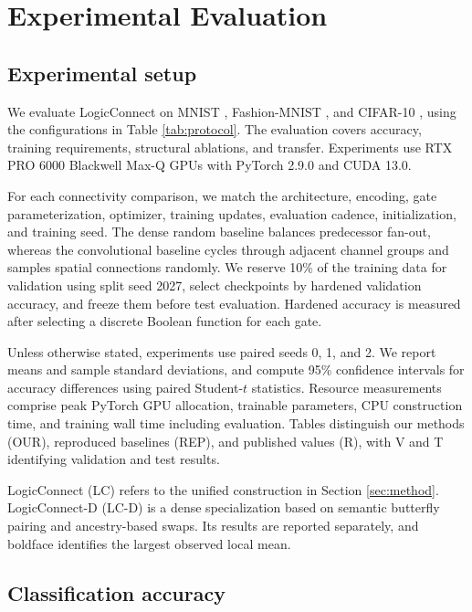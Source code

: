 



\section{Experimental Evaluation}

\subsection{Experimental setup}

We evaluate LogicConnect on MNIST \cite{lecun1998}, Fashion-MNIST \cite{xiao2017}, and CIFAR-10 \cite{krizhevsky2009}, using the configurations in Table \ref{tab:protocol}. The evaluation covers accuracy, training requirements, structural ablations, and transfer. Experiments use RTX PRO 6000 Blackwell Max-Q GPUs with PyTorch 2.9.0 and CUDA 13.0.



For each connectivity comparison, we match the architecture, encoding, gate parameterization, optimizer, training updates, evaluation cadence, initialization, and training seed. The dense random baseline balances predecessor fan-out, whereas the convolutional baseline cycles through adjacent channel groups and samples spatial connections randomly. We reserve 10\% of the training data for validation using split seed 2027, select checkpoints by hardened validation accuracy, and freeze them before test evaluation. Hardened accuracy is measured after selecting a discrete Boolean function for each gate.

Unless otherwise stated, experiments use paired seeds 0, 1, and 2. We report means and sample standard deviations, and compute 95\% confidence intervals for accuracy differences using paired Student-$t$ statistics. Resource measurements comprise peak PyTorch GPU allocation, trainable parameters, CPU construction time, and training wall time including evaluation. Tables distinguish our methods (OUR), reproduced baselines (REP), and published values (R), with V and T identifying validation and test results.

LogicConnect (LC) refers to the unified construction in Section \ref{sec:method}. LogicConnect-D (LC-D) is a dense specialization based on semantic butterfly pairing and ancestry-based swaps. Its results are reported separately, and boldface identifies the largest observed local mean.

\subsection{Classification accuracy}

